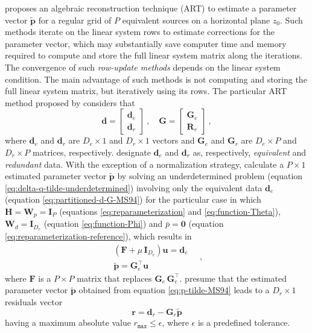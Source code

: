 \cite{mendonca-silva1994} proposes an algebraic reconstruction technique (ART) \cite[e.g.,][p. 58]{sluis-vorst1987}
to estimate a parameter vector $\tilde{\mathbf{p}}$ for a regular grid of $P$ equivalent sources on a horizontal plane $z_{0}$.
Such methods iterate on the linear system rows to estimate corrections for the parameter vector,
which may substantially save computer time and memory required to compute and store the full linear system matrix
along the iterations.
The convergence of such \textit{row-update methods} depends on the linear system condition.
The main advantage of such methods is not computing and storing the full linear system matrix, but iteratively using 
its rows.
The particular ART method proposed by \cite{mendonca-silva1994} considers that
\begin{equation}
	\mathbf{d} = \begin{bmatrix}
		\mathbf{d}_{e} \\ \mathbf{d}_{r}
	\end{bmatrix} \: , \quad 
	\mathbf{G} = \begin{bmatrix}
		\mathbf{G}_{e} \\ \mathbf{R}_{r}
	\end{bmatrix} \: ,
	\label{eq:partitioned-d-G-MS94}
\end{equation}
where $\mathbf{d}_{e}$ and $\mathbf{d}_{r}$ are $D_{e} \times 1$ and $D_{r} \times 1$ vectors and
$\mathbf{G}_{e}$ and $\mathbf{G}_{r}$ are $D_{e} \times P$ and $D_{r} \times P$ matrices, respectively.
\cite{mendonca-silva1994} designate $\mathbf{d}_{e}$ and $\mathbf{d}_{r}$ as, respectively, \textit{equivalent} and \textit{redundant} data.
With the exception of a normalization strategy, \cite{mendonca-silva1994} calculate a $P \times 1$ estimated parameter vector $\tilde{\mathbf{p}}$ 
by solving an underdetermined problem (equation \ref{eq:delta-q-tilde-underdetermined}) involving only the equivalent data $\mathbf{d}_{e}$ 
(equation \ref{eq:partitioned-d-G-MS94})
for the particular case in which $\mathbf{H} = \mathbf{W}_{p} = \mathbf{I}_{P}$ (equations \ref{eq:reparameterization} and \ref{eq:function-Theta}),
$\mathbf{W}_{d} = \mathbf{I}_{D_{e}}$ (equation \ref{eq:function-Phi}) and $\bar{p} = \mathbf{0}$ (equation \ref{eq:reparameterization-reference}), 
which results in
\begin{equation}
	\begin{split}
		\left(\mathbf{F} + \mu \, \mathbf{I}_{D_{e}} \right) \mathbf{u} = \mathbf{d}_{e} \\
		\tilde{\mathbf{p}} = \mathbf{G}_{e}^{\top} \mathbf{u}
	\end{split} \quad ,
	\label{eq:p-tilde-MS94}
\end{equation}
where $\mathbf{F}$ is a $P \times P$ matrix that replaces $\mathbf{G}_{e} \, \mathbf{G}_{e}^{\top}$.
\cite{mendonca-silva1994} presume that the estimated parameter vector $\tilde{\mathbf{p}}$ obtained from equation \ref{eq:p-tilde-MS94}
leads to a $D_{r} \times 1$ residuals vector
\begin{equation}
	\mathbf{r} = \mathbf{d}_{r} - \mathbf{G}_{r} \tilde{\mathbf{p}} 
	\label{eq:residuals-MS94}
\end{equation}
having a maximum absolute value $r_{\mathtt{max}} \le \epsilon$, where $\epsilon$ is a predefined tolerance.


